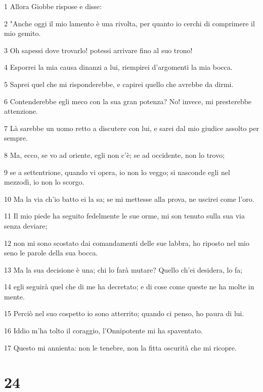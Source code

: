 \par 1 Allora Giobbe rispose e disse:
\par 2 "Anche oggi il mio lamento è una rivolta, per quanto io cerchi di comprimere il mio gemito.
\par 3 Oh sapessi dove trovarlo! potessi arrivare fino al suo trono!
\par 4 Esporrei la mia causa dinanzi a lui, riempirei d'argomenti la mia bocca.
\par 5 Saprei quel che mi risponderebbe, e capirei quello che avrebbe da dirmi.
\par 6 Contenderebbe egli meco con la sua gran potenza? No! invece, mi presterebbe attenzione.
\par 7 Là sarebbe un uomo retto a discutere con lui, e sarei dal mio giudice assolto per sempre.
\par 8 Ma, ecco, se vo ad oriente, egli non c'è; se ad occidente, non lo trovo;
\par 9 se a settentrione, quando vi opera, io non lo veggo; si nasconde egli nel mezzodì, io non lo scorgo.
\par 10 Ma la via ch'io batto ei la sa; se mi mettesse alla prova, ne uscirei come l'oro.
\par 11 Il mio piede ha seguito fedelmente le sue orme, mi son tenuto sulla sua via senza deviare;
\par 12 non mi sono scostato dai comandamenti delle sue labbra, ho riposto nel mio seno le parole della sua bocca.
\par 13 Ma la sua decisione è una; chi lo farà mutare? Quello ch'ei desidera, lo fa;
\par 14 egli seguirà quel che di me ha decretato; e di cose come queste ne ha molte in mente.
\par 15 Perciò nel suo cospetto io sono atterrito; quando ci penso, ho paura di lui.
\par 16 Iddio m'ha tolto il coraggio, l'Onnipotente mi ha spaventato.
\par 17 Questo mi annienta: non le tenebre, non la fitta oscurità che mi ricopre.

\chapter{24}

